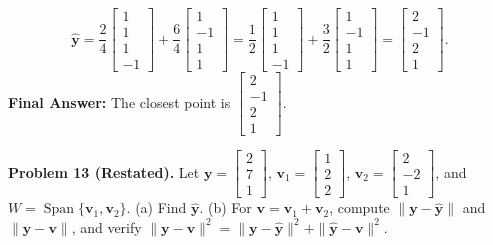 \documentclass[11pt, letterpaper]{article}
\theoremstyle{definition}
\theoremstyle{remark}
\begin{document}
\[
\hat{\mathbf{y}} = \frac{2}{4}\begin{bmatrix} 1 \\ 1 \\ 1 \\ -1 \end{bmatrix} + \frac{6}{4}\begin{bmatrix} 1 \\ -1 \\ 1 \\ 1 \end{bmatrix} = \frac{1}{2}\begin{bmatrix} 1 \\ 1 \\ 1 \\ -1 \end{bmatrix} + \frac{3}{2}\begin{bmatrix} 1 \\ -1 \\ 1 \\ 1 \end{bmatrix} = \begin{bmatrix} 2 \\ -1 \\ 2 \\ 1 \end{bmatrix}.
\]
\textbf{Final Answer:} The closest point is $\begin{bmatrix} 2 \\ -1 \\ 2 \\ 1 \end{bmatrix}$.

\medskip
\textbf{Problem 13 (Restated).} Let $\mathbf{y} = \begin{bmatrix} 2 \\ 7 \\ 1 \end{bmatrix}$, $\mathbf{v}_1 = \begin{bmatrix} 1 \\ 2 \\ 2 \end{bmatrix}$, $\mathbf{v}_2 = \begin{bmatrix} 2 \\ -2 \\ 1 \end{bmatrix}$, and $W = \operatorname{Span}\{\mathbf{v}_1, \mathbf{v}_2\}$. (a) Find $\hat{\mathbf{y}}$. (b) For $\mathbf{v} = \mathbf{v}_1 + \mathbf{v}_2$, compute $\|\mathbf{y} - \hat{\mathbf{y}}\|$ and $\|\mathbf{y} - \mathbf{v}\|$, and verify $\|\mathbf{y} - \mathbf{v}\|^2 = \|\mathbf{y} - \hat{\mathbf{y}}\|^2 + \|\hat{\mathbf{y}} - \mathbf{v}\|^2$.
\end{document}
